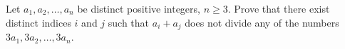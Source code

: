 Let $a_1, a_2, \ldots, a_n$ be distinct positive integers, $n \geq 3$. Prove that there exist distinct indices $i$ and $j$ such that $a_i + a_j$ does not divide any of the numbers $3a_1, 3a_2, \ldots, 3a_n$.
